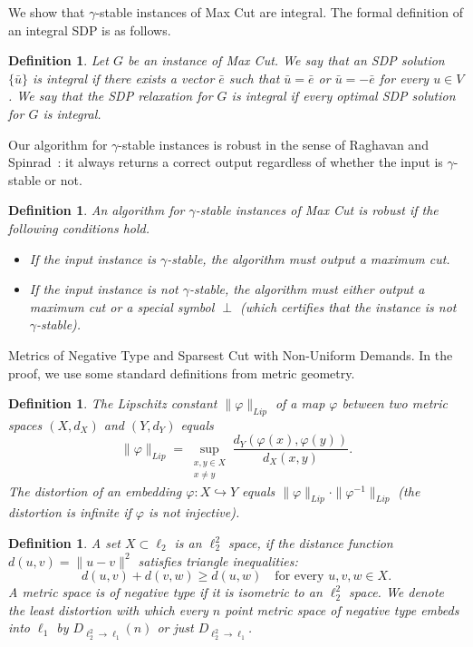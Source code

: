 \documentclass[twoside,leqno,twocolumn]{article}
\makeatletter
\def\paragraph{\@startsection  
 {paragraph}{4}{\parindent}{5pt}{-5pt}{\normalsize\bf}}
\newtheorem{Definition}[theorem]{Definition}
\makeatother
\begin{document}
We show that $\gamma$-stable instances of Max Cut are integral. The formal definition of an integral SDP is as follows.

\begin{Definition} 
Let $G$ be an instance of Max Cut.
We say that an SDP solution $\{\bar u\}$ 
is integral if  there exists a vector $\bar e$ such that $\bar u = \bar e$ or 
$\bar u = -\bar e$ for every $u\in V$.
We say that the SDP relaxation for $G$ is integral if every optimal SDP solution for $G$ is integral.
\end{Definition}
 
Our algorithm for $\gamma$-stable instances is robust in the sense of Raghavan and Spinrad~\cite{RS}:
it always returns a correct output regardless of whether the input is $\gamma$-stable or not.
\begin{Definition} An algorithm for $\gamma$-stable instances of Max Cut is robust if the following conditions hold.
\begin{itemize}
\item If the input instance is $\gamma$-stable, the algorithm must output a maximum cut.
\item If the input instance is not $\gamma$-stable, the algorithm must either output a maximum cut or a special symbol $\perp$
(which certifies that the instance is not $\gamma$-stable).
\end{itemize}
\end{Definition}

\paragraph{Metrics of Negative Type and Sparsest Cut with Non-Uniform Demands.} In the proof, we use some standard definitions from metric geometry.
\begin{Definition}
The Lipschitz constant $\|\varphi\|_{Lip}$ of a map $\varphi$ between two metric spaces $(X,d_X)$ and $(Y, d_Y)$ 
equals 
$$\|\varphi\|_{Lip} = \sup_{\substack{x, y \in X \\ x\neq y}} \frac{d_Y(\varphi(x),\varphi(y))}{d_X(x,y)}.$$
The distortion of an embedding $\varphi:X \hookrightarrow Y$ equals $\|\varphi\|_{Lip} \cdot \|\varphi^{-1}\|_{Lip}$
(the distortion is infinite if $\varphi$ is not injective).
\end{Definition}

\begin{Definition} A set $X \subset \ell_2$ is an $\ell_2^2$ space, if the  distance function $d(u,v) = \|u-v\|^2$ 
satisfies triangle inequalities:
$$d(u,v) + d(v,w) \geq d(u,w) \quad\text{for every } u,v,w \in X.$$
A metric space is of negative type if it is isometric to an $\ell_2^2$ space.
We denote the least distortion with which every $n$ point metric space of negative type embeds into $\ell_1$ by $D_{\ell_2^2\to \ell_1} (n)$ or just $D_{\ell_2^2\to \ell_1}$.
\end{Definition}
\end{document}
